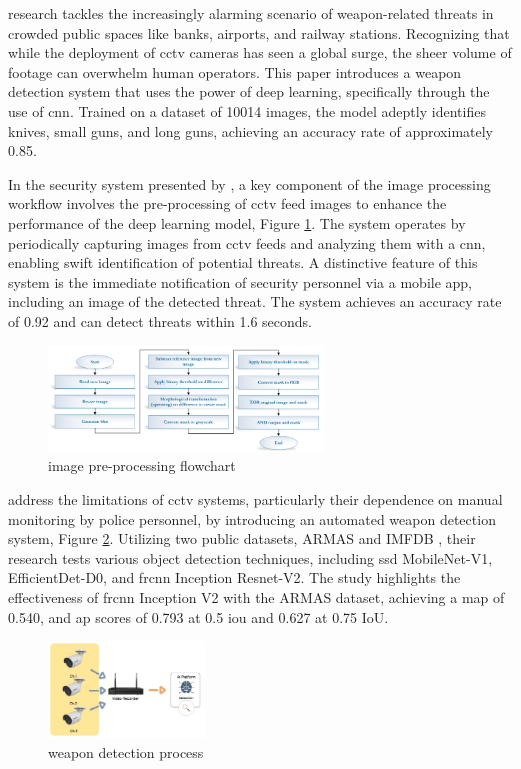 \citet{rfc6} research tackles the increasingly alarming scenario of weapon-related threats in crowded public spaces like banks, airports, and railway stations. Recognizing that while the deployment of \ac{cctv} cameras has seen a global surge, the sheer volume of footage can overwhelm human operators. This paper introduces a weapon detection system that uses the power of deep learning, specifically through the use of \ac{cnn}. Trained on a dataset of 10014 images, the model adeptly identifies knives, small guns, and long guns, achieving an accuracy rate of approximately 0.85.

In the security system presented by \citet{rfc19}, a key component of the image processing workflow involves the pre-processing of \ac{cctv} feed images to enhance the performance of the deep learning model, Figure \ref{fig:al-mousa-flow}. The system operates by periodically capturing images from \ac{cctv} feeds and analyzing them with a \ac{cnn}, enabling swift identification of potential threats. A distinctive feature of this system is the immediate notification of security personnel via a mobile app, including an image of the detected threat. The system achieves an accuracy rate of 0.92 and can detect threats within 1.6 seconds.

\begin{figure}[h]
    \centering 
    \includegraphics[width=0.65\textwidth]{figs/al-mousa-flowchart.png} 
    \caption{\citet{rfc19} image pre-processing flowchart}
    \label{fig:al-mousa-flow}
\end{figure}

\citet{rfc20} address the limitations of \ac{cctv} systems, particularly their dependence on manual monitoring by police personnel, by introducing an automated weapon detection system, Figure \ref{fig:hnoohom-system}. Utilizing two public datasets, ARMAS and IMFDB \cite{rfc28}, their research tests various object detection techniques, including \ac{ssd} MobileNet-V1, EfficientDet-D0, and \ac{frcnn} Inception Resnet-V2. The study highlights the effectiveness of \ac{frcnn} Inception V2 with the ARMAS dataset, achieving a \ac{map} of 0.540, and \ac{ap} scores of 0.793 at 0.5 \ac{iou} and 0.627 at 0.75 IoU.
\begin{figure}[h]
    \centering 
    \includegraphics[width=0.37\textwidth]{figs/hnoohom-system.png} 
    \caption{\citet{rfc20} weapon detection process}
    \label{fig:hnoohom-system}
\end{figure}

